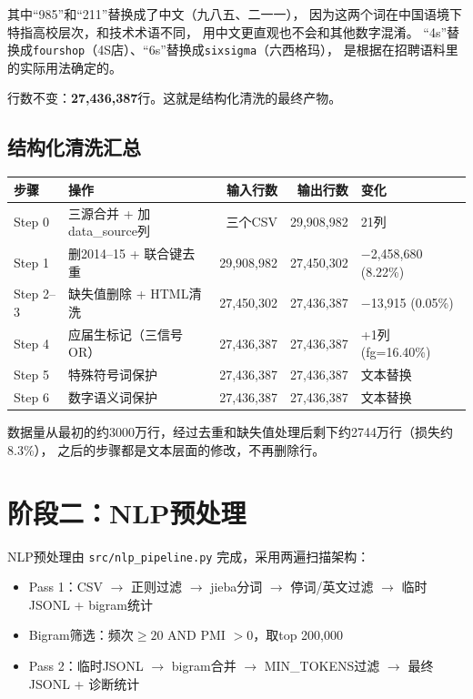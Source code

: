 \documentclass[12pt,a4paper]{ctexart}
\begin{document}
其中``985''和``211''替换成了中文（九八五、二一一），
因为这两个词在中国语境下特指高校层次，和技术术语不同，
用中文更直观也不会和其他数字混淆。
``4s''替换成\texttt{fourshop}（4S店）、``6s''替换成\texttt{sixsigma}（六西格玛），
是根据在招聘语料里的实际用法确定的。

行数不变：\textbf{27,436,387}行。这就是结构化清洗的最终产物。


\subsection{结构化清洗汇总}

\begin{table}[h]
\centering
\begin{tabular}{llrrl}
\toprule
\textbf{步骤} & \textbf{操作} & \textbf{输入行数} & \textbf{输出行数} & \textbf{变化} \\
\midrule
Step 0 & 三源合并 + 加data\_source列 & 三个CSV & 29,908,982 & 21列 \\
Step 1 & 删2014--15 + 联合键去重 & 29,908,982 & 27,450,302 & $-$2,458,680 (8.22\%) \\
Step 2--3 & 缺失值删除 + HTML清洗 & 27,450,302 & 27,436,387 & $-$13,915 (0.05\%) \\
Step 4 & 应届生标记（三信号OR） & 27,436,387 & 27,436,387 & +1列 (fg=16.40\%) \\
Step 5 & 特殊符号词保护 & 27,436,387 & 27,436,387 & 文本替换 \\
Step 6 & 数字语义词保护 & 27,436,387 & 27,436,387 & 文本替换 \\
\bottomrule
\end{tabular}
\end{table}

数据量从最初的约3000万行，经过去重和缺失值处理后剩下约2744万行（损失约8.3\%），
之后的步骤都是文本层面的修改，不再删除行。


\section{阶段二：NLP预处理}
\label{sec:nlp}

NLP预处理由 \texttt{src/nlp\_pipeline.py} 完成，采用两遍扫描架构：
\begin{itemize}
\item Pass 1：CSV $\to$ 正则过滤 $\to$ jieba分词 $\to$ 停词/英文过滤 $\to$ 临时JSONL + bigram统计
\item Bigram筛选：频次$\geq 20$ AND PMI $> 0$，取top 200,000
\item Pass 2：临时JSONL $\to$ bigram合并 $\to$ MIN\_TOKENS过滤 $\to$ 最终JSONL + 诊断统计
\end{itemize}
\end{document}

